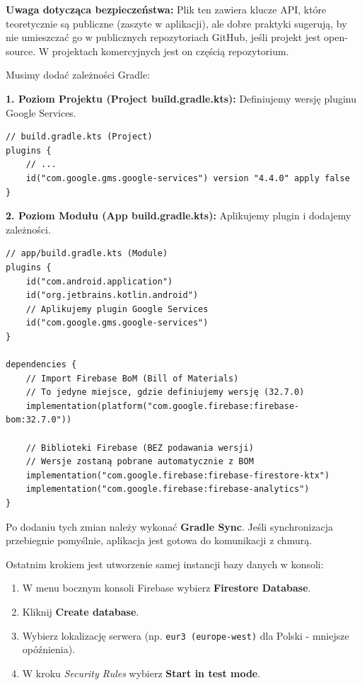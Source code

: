 \textbf{Uwaga dotycząca bezpieczeństwa:} Plik ten zawiera klucze API, które teoretycznie są publiczne (zaszyte w aplikacji), ale dobre praktyki sugerują, by nie umieszczać go w publicznych repozytoriach GitHub, jeśli projekt jest open-source. W projektach komercyjnych jest on częścią repozytorium.

Musimy dodać zależności Gradle:

\textbf{1. Poziom Projektu (Project build.gradle.kts):}
Definiujemy wersję pluginu Google Services.

\begin{verbatim}
// build.gradle.kts (Project)
plugins {
    // ...
    id("com.google.gms.google-services") version "4.4.0" apply false
}
\end{verbatim}

\textbf{2. Poziom Modułu (App build.gradle.kts):}
Aplikujemy plugin i dodajemy zależności.

\begin{verbatim}
// app/build.gradle.kts (Module)
plugins {
    id("com.android.application")
    id("org.jetbrains.kotlin.android")
    // Aplikujemy plugin Google Services
    id("com.google.gms.google-services")
}

dependencies {
    // Import Firebase BoM (Bill of Materials)
    // To jedyne miejsce, gdzie definiujemy wersję (32.7.0)
    implementation(platform("com.google.firebase:firebase-bom:32.7.0"))

    // Biblioteki Firebase (BEZ podawania wersji)
    // Wersje zostaną pobrane automatycznie z BOM
    implementation("com.google.firebase:firebase-firestore-ktx")
    implementation("com.google.firebase:firebase-analytics")
}
\end{verbatim}

Po dodaniu tych zmian należy wykonać \textbf{Gradle Sync}. Jeśli synchronizacja przebiegnie pomyślnie, aplikacja jest gotowa do komunikacji z chmurą.

Ostatnim krokiem jest utworzenie samej instancji bazy danych w konsoli:
\begin{enumerate}
    \item W menu bocznym konsoli Firebase wybierz \textbf{Firestore Database}.
    \item Kliknij \textbf{Create database}.
    \item Wybierz lokalizację serwera (np. \texttt{eur3 (europe-west)} dla Polski - mniejsze opóźnienia).
    \item W kroku \textit{Security Rules} wybierz \textbf{Start in test mode}.
\end{enumerate}

